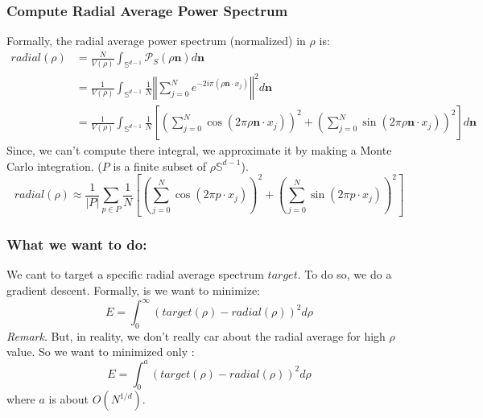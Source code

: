 \documentclass{classeENS}
\begin{document}
\subsubsection{Compute Radial Average Power Spectrum}
Formally, the radial average power spectrum (normalized) in $\rho$ is:
\begin{align*}
    radial(\rho) & = \frac{N}{V(\rho)}\int_{\mathbb{S}^{d-1}} \mathcal P_S(\rho \textbf{n}) d\textbf{n} \\
        &= \frac{1}{V(\rho)} \int_{\mathbb{S}^{d-1}} \frac{1}{N}\left \Vert \sum_{j=0}^N e^{-2i\pi(\rho \textbf{n}\cdot x_j)}  \right \Vert^2 d\textbf{n} \\
        &= \frac{1}{V(\rho)} \int_{\mathbb{S}^{d-1}} \frac{1}{N} \left [ \left ( \sum_{j=0}^N \cos(2\pi\rho \textbf{n}\cdot x_j) \right )^2 + \left ( \sum_{j=0}^N \sin(2\pi\rho \textbf{n}\cdot x_j) \right )^2\right ]  d\textbf{n}
\end{align*}  
Since, we can't compute there integral, we approximate it by making a Monte Carlo integration. ($P$ is a finite subset of $\rho\mathbb{S}^{d-1}$).
    \[ radial(\rho) \approx \frac{1}{|P|} \sum_{p\in P} \frac{1}{N} \left [ \left ( \sum_{j=0}^N \cos(2\pi p\cdot x_j) \right )^2 + \left ( \sum_{j=0}^N \sin(2\pi p\cdot x_j) \right )^2\right ] \]

\subsubsection{What we want to do:}
We cant to target a specific radial average spectrum $target$. To do so, we do a gradient descent.
Formally, is we want to minimize:
\[ E = \int_0^\infty (target(\rho) - radial(\rho))^2 d\rho \]
\> \textit{Remark}. But, in reality, we don't really car about the radial average for high $\rho$ value. So we want to minimized only :
\[ E = \int_0^a (target(\rho) - radial(\rho))^2 d\rho \]
where $a$ is about $O(N^{1/d})$.
\end{document}
